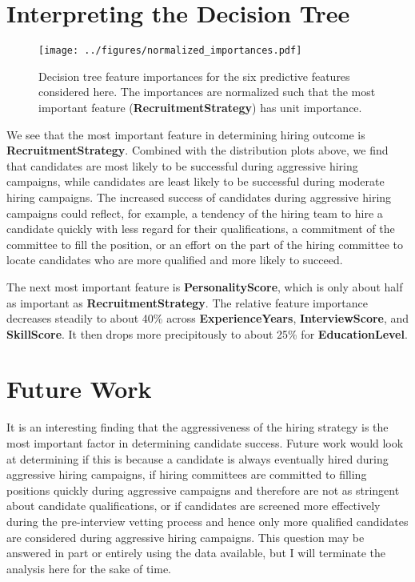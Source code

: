 \documentclass[12pt]{article}
\begin{document}
\section{Interpreting the Decision Tree}

\begin{figure}[H]
    \centerline{\texttt{[image: ../figures/normalized\_importances.pdf]}}
    \caption{Decision tree feature importances for the six predictive features considered here. The importances are normalized such that the most important feature ({\bf RecruitmentStrategy}) has unit importance.}
    \label{fig:importance}
\end{figure}

We see that the most important feature in determining hiring outcome is {\bf RecruitmentStrategy}. Combined with the distribution plots above, we find that candidates are most likely to be successful during aggressive hiring campaigns, while candidates are least likely to be successful during moderate hiring campaigns. The increased success of candidates during aggressive hiring campaigns could reflect, for example, a tendency of the hiring team to hire a candidate quickly with less regard for their qualifications, a commitment of the committee to fill the position, or an effort on the part of the hiring committee to locate candidates who are more qualified and more likely to succeed.

The next most important feature is {\bf PersonalityScore}, which is only about half as important as {\bf RecruitmentStrategy}. The relative feature importance decreases steadily to about 40\% across {\bf ExperienceYears}, {\bf InterviewScore}, and {\bf SkillScore}. It then drops more precipitously to about 25\% for {\bf EducationLevel}.

\section{Future Work}

It is an interesting finding that the aggressiveness of the hiring strategy is the most important factor in determining candidate success. Future work would look at determining if this is because a candidate is always eventually hired during aggressive hiring campaigns, if hiring committees are committed to filling positions quickly during aggressive campaigns and therefore are not as stringent about candidate qualifications, or if candidates are screened more effectively during the pre-interview vetting process and hence only more qualified candidates are considered during aggressive hiring campaigns. This question may be answered in part or entirely using the data available, but I will terminate the analysis here for the sake of time.
\end{document}
